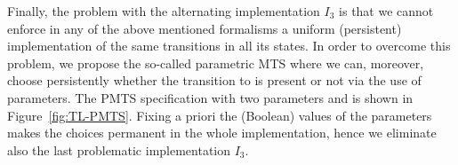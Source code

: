Finally, the problem with the alternating implementation $I_3$ is 
that we cannot enforce in any of the above mentioned formalisms 
a uniform (persistent) 
implementation of the same transitions in all its states.
In order to overcome this problem, we propose the so-called parametric 
MTS where we can, moreover, choose persistently whether the transition 
to \yellow is present or not via the use of parameters. 
The PMTS specification with two parameters
\mustGoYellowRed and \mustGoYellow is shown in Figure~\ref{fig:TL-PMTS}. 
Fixing a priori the (Boolean) values of the parameters
makes the choices permanent in the whole implementation, hence
we eliminate also the last problematic implementation $I_3$.
